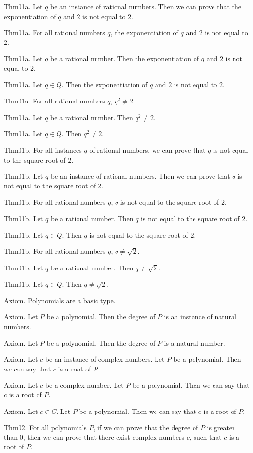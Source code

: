 \documentclass{article}
\begin{document}
Thm01a. Let $q$ be an instance of rational numbers. Then we can prove that the exponentiation of $q$ and $2$ is not equal to $2$.

Thm01a. For all rational numbers $q$, the exponentiation of $q$ and $2$ is not equal to $2$.

Thm01a. Let $q$ be a rational number. Then the exponentiation of $q$ and $2$ is not equal to $2$.

Thm01a. Let $q \in Q$. Then the exponentiation of $q$ and $2$ is not equal to $2$.

Thm01a. For all rational numbers $q$, $q ^{ 2}\neq 2$.

Thm01a. Let $q$ be a rational number. Then $q ^{ 2}\neq 2$.

Thm01a. Let $q \in Q$. Then $q ^{ 2}\neq 2$.

Thm01b. For all instances $q$ of rational numbers, we can prove that $q$ is not equal to the square root of $2$.

Thm01b. Let $q$ be an instance of rational numbers. Then we can prove that $q$ is not equal to the square root of $2$.

Thm01b. For all rational numbers $q$, $q$ is not equal to the square root of $2$.

Thm01b. Let $q$ be a rational number. Then $q$ is not equal to the square root of $2$.

Thm01b. Let $q \in Q$. Then $q$ is not equal to the square root of $2$.

Thm01b. For all rational numbers $q$, $q \neq \sqrt{ 2}$.

Thm01b. Let $q$ be a rational number. Then $q \neq \sqrt{ 2}$.

Thm01b. Let $q \in Q$. Then $q \neq \sqrt{ 2}$.

Axiom. Polynomials are a basic type.

Axiom. Let $P$ be a polynomial. Then the degree of $P$ is an instance of natural numbers.

Axiom. Let $P$ be a polynomial. Then the degree of $P$ is a natural number.

Axiom. Let $c$ be an instance of complex numbers. Let $P$ be a polynomial. Then we can say that $c$ is a root of $P$.

Axiom. Let $c$ be a complex number. Let $P$ be a polynomial. Then we can say that $c$ is a root of $P$.

Axiom. Let $c \in C$. Let $P$ be a polynomial. Then we can say that $c$ is a root of $P$.

Thm02. For all polynomials $P$, if we can prove that the degree of $P$ is greater than $0$, then we can prove that there exist complex numbers $c$, such that $c$ is a root of $P$.
\end{document}
